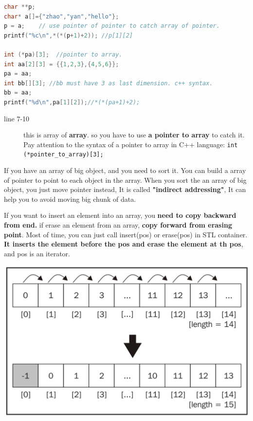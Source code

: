 \documentclass[a4paper,11pt,twoside]{book}
\begin{document}
\begin{lstlisting}[frame=single, language=c++]
char **p;
char* a[]={"zhao","yan","hello"}; 
p = a;    // use pointer of pointer to catch array of pointer.
printf("%c\n",*(*(p+1)+2)); //p[1][2]

int (*pa)[3];  //pointer to array.
int aa[2][3] = {{1,2,3},{4,5,6}};
pa = aa;
int bb[][3]; //bb must have 3 as last dimension. c++ syntax.
bb = aa;
printf("%d\n",pa[1][2]);//*(*(pa+1)+2);
\end{lstlisting} 
\begin{description}
	\item[line 7-10] this is array of \textbf{array}. so you have to use \textbf{a pointer to array} to catch it. Pay attention to the syntax of a pointer to array in C++ language: \texttt{int (*pointer\_to\_array)[3];}
\end{description}




	\par If you have an array of big object, and you need to sort it. You can build a array of pointer to point to each object in the array. When you sort the an array of big object,  you just move pointer instead, It is called \textbf{"indirect addressing"}, It can help you to avoid moving big chunk of data.  


	\par If you want to insert an element into an array, you  \textbf{need to copy backward from end. }
if erase an element from an array, \textbf{copy forward from erasing point}. Most of time, you can just call insert(pos) or erase(pos) in STL container. \textbf{It inserts the element before the pos and erase the element at th pos}, and pos is an iterator.  

\includegraphics[scale=0.35]{pics/array_insert.png} \newline
\end{document}
